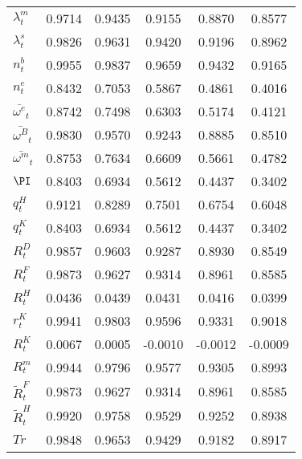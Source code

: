 \begin{center}
\begin{longtable}{lccccc}
$ \lambda^m_t       $	 & 	    0.9714	 & 	    0.9435	 & 	    0.9155	 & 	    0.8870	 & 	    0.8577 \\ 
$ \lambda^s_t       $	 & 	    0.9826	 & 	    0.9631	 & 	    0.9420	 & 	    0.9196	 & 	    0.8962 \\ 
$ n^b_t             $	 & 	    0.9955	 & 	    0.9837	 & 	    0.9659	 & 	    0.9432	 & 	    0.9165 \\ 
$ n^e_t             $	 & 	    0.8432	 & 	    0.7053	 & 	    0.5867	 & 	    0.4861	 & 	    0.4016 \\ 
$ \bar{\omega^e}_t  $	 & 	    0.8742	 & 	    0.7498	 & 	    0.6303	 & 	    0.5174	 & 	    0.4121 \\ 
$ \bar{\omega^B}_t  $	 & 	    0.9830	 & 	    0.9570	 & 	    0.9243	 & 	    0.8885	 & 	    0.8510 \\ 
$ \bar{\omega^m}_t  $	 & 	    0.8753	 & 	    0.7634	 & 	    0.6609	 & 	    0.5661	 & 	    0.4782 \\ 
$ \PI               $	 & 	    0.8403	 & 	    0.6934	 & 	    0.5612	 & 	    0.4437	 & 	    0.3402 \\ 
$ q^H_t             $	 & 	    0.9121	 & 	    0.8289	 & 	    0.7501	 & 	    0.6754	 & 	    0.6048 \\ 
$  q^K_t            $	 & 	    0.8403	 & 	    0.6934	 & 	    0.5612	 & 	    0.4437	 & 	    0.3402 \\ 
$  R^D_t            $	 & 	    0.9857	 & 	    0.9603	 & 	    0.9287	 & 	    0.8930	 & 	    0.8549 \\ 
$ R^F_t             $	 & 	    0.9873	 & 	    0.9627	 & 	    0.9314	 & 	    0.8961	 & 	    0.8585 \\ 
$   R^H_t           $	 & 	    0.0436	 & 	    0.0439	 & 	    0.0431	 & 	    0.0416	 & 	    0.0399 \\ 
$ r^K_t             $	 & 	    0.9941	 & 	    0.9803	 & 	    0.9596	 & 	    0.9331	 & 	    0.9018 \\ 
$  R^K_t            $	 & 	    0.0067	 & 	    0.0005	 & 	   -0.0010	 & 	   -0.0012	 & 	   -0.0009 \\ 
$  R^m_t            $	 & 	    0.9944	 & 	    0.9796	 & 	    0.9577	 & 	    0.9305	 & 	    0.8993 \\ 
$  \tilde{R}^F_t    $	 & 	    0.9873	 & 	    0.9627	 & 	    0.9314	 & 	    0.8961	 & 	    0.8585 \\ 
$  \tilde{R}^H_t    $	 & 	    0.9920	 & 	    0.9758	 & 	    0.9529	 & 	    0.9252	 & 	    0.8938 \\ 
$ Tr                $	 & 	    0.9848	 & 	    0.9653	 & 	    0.9429	 & 	    0.9182	 & 	    0.8917 \\ 

\end{longtable}
\end{center}
